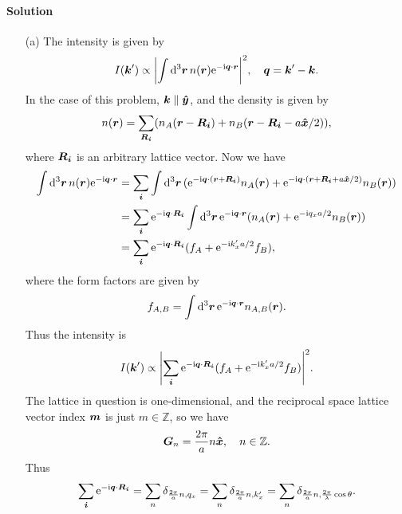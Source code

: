 \documentclass[hyperref, a4paper]{article}
\newcommand*{\ii}{\mathrm{i}}
\newcommand*{\ee}{\mathrm{e}}
\begin{document}
\paragraph{Solution} \begin{itemize}

\item[(a)] The intensity is given by 
\begin{equation}
    I(\vb*{k}') \propto \abs{\int \dd[3]{\vb*{r}} n(\vb*{r}) \ee^{- \ii \vb*{q} \cdot \vb*{r}}}^2, \quad \vb*{q} = \vb*{k}' - \vb*{k}.
\end{equation}
In the case of this problem, $\vb*{k} \parallel \vu*{y}$,
and the density is given by 
\[
    n(\vb*{r}) = \sum_{\vb*{R}_{\vb*{i}}} (
        n_A(\vb*{r} - \vb*{R}_{\vb*{i}}) 
        + n_B(\vb*{r} - \vb*{R}_{\vb*{i}} - a \vu*{x} / 2)),
\]
where $\vb*{R}_{\vb*{i}}$ is an arbitrary lattice vector.
Now we have 
\[
    \begin{aligned}
        \int \dd[3]{\vb*{r}} n(\vb*{r}) \ee^{- \ii \vb*{q} \cdot \vb*{r}} &= 
        \sum_{\vb*{i}} \int \dd[3]{\vb*{r}} 
        (\ee^{- \ii \vb*{q} \cdot (\vb*{r} + \vb*{R}_{\vb*{i}})} n_A(\vb*{r})
        + \ee^{-\ii \vb*{q} \cdot (\vb*{r} + \vb*{R}_{\vb*{i}} + a \vu*{x} / 2)} n_B(\vb*{r})) \\
        &= \sum_{\vb*{i}} \ee^{- \ii \vb*{q} \cdot \vb*{R}_{\vb*{i}}}
        \int \dd[3]{\vb*{r}} \ee^{- \ii \vb*{q} \cdot \vb*{r}} (n_A(\vb*{r}) + \ee^{- \ii q_x a /2 } n_B(\vb*{r})) \\
        &= \sum_{\vb*{i}} \ee^{- \ii \vb*{q} \cdot \vb*{R}_{\vb*{i}}} (f_A + \ee^{- \ii k'_x a / 2} f_B),
    \end{aligned}
\]
where the form factors are given by 
\begin{equation}
    f_{A, B} = \int \dd[3]{\vb*{r}} \ee^{- \ii \vb*{q} \cdot \vb*{r}} n_{A, B} (\vb*{r}) .
\end{equation}
Thus the intensity is 
\[
    I(\vb*{k}') \propto \abs{\sum_{\vb*{i}} \ee^{- \ii \vb*{q} \cdot \vb*{R}_{\vb*{i}}} (f_A + \ee^{- \ii k'_x a / 2} f_B)}^2.
\]
The lattice in question is one-dimensional, 
and the reciprocal space lattice vector index $\vb*{m}$ is just $m \in \mathbb{Z}$,
so we have 
\[
    \vb*{G}_n = \frac{2\pi}{a} n \vu*{x}, \quad n \in \mathbb{Z}.
\]
Thus 
\begin{equation}
    \sum_{\vb*{i}} \ee^{- \ii \vb*{q} \cdot \vb*{R}_{\vb*{i}}} = \sum_{n} \delta_{\frac{2\pi}{a}n, q_x} = 
    \sum_{n} \delta_{\frac{2\pi}{a} n, k_x'} = \sum_{n} \delta_{\frac{2\pi}{a}n, \frac{2\pi}{\lambda} \cos \theta}.

\end{equation}
\end{itemize}
\end{document}
